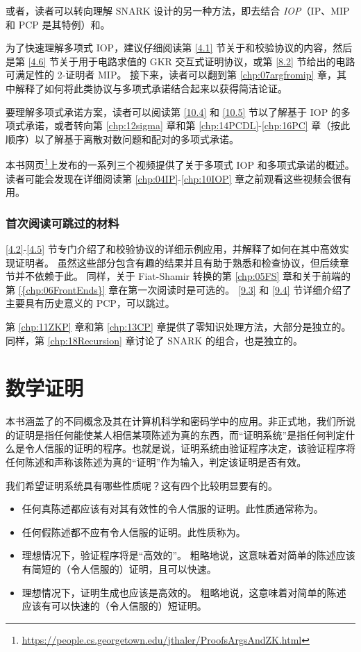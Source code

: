 或者，读者可以转向理解 SNARK 设计的另一种方法，即去结合 \emph{IOP}（IP、MIP 和 PCP 是其特例）和。

为了快速理解多项式 IOP，建议仔细阅读第 \ref{4.1} 节关于和校验协议的内容，然后是第 \ref{4.6} 节关于用于电路求值的 GKR 交互式证明协议，或第 \ref{8.2} 节给出的电路可满足性的 2-证明者 MIP。 
接下来，读者可以翻到第 \ref{chp:07argfromip} 章，其中解释了如何将此类协议与多项式承诺结合起来以获得简洁论证。

要理解多项式承诺方案，读者可以阅读第 \ref{10.4} 和 \ref{10.5} 节以了解基于 IOP 的多项式承诺，或者转向第 \ref{chp:12sigma} 章和第 \ref{chp:14PCDL}-\ref{chp:16PC} 章（按此顺序）以了解基于离散对数问题和配对的多项式承诺。

本书网页\footnote{\url{https://people.cs.georgetown.edu/jthaler/ProofsArgsAndZK.html}}上发布的一系列三个视频提供了关于多项式 IOP 和多项式承诺的概述。 读者可能会发现在详细阅读第 \ref{chp:04IP}-\ref{chp:10IOP} 章之前观看这些视频会很有用。


\subsubsection{首次阅读可跳过的材料} 
\ref{4.2}-\ref{4.5} 节专门介绍了和校验协议的详细示例应用，并解释了如何在其中高效实现证明者。 虽然这些部分包含有趣的结果并且有助于熟悉和检查协议，但后续章节并不依赖于此。 同样，关于 Fiat-Shamir 转换的第 \ref{chp:05FS} 章和关于前端的第 \ref{{chp:06FrontEnds}} 章在第一次阅读时是可选的。 \ref{9.3} 和 \ref{9.4} 节详细介绍了主要具有历史意义的 PCP，可以跳过。

第 \ref{chp:11ZKP} 章和第 \ref{chp:13CP} 章提供了零知识处理方法，大部分是独立的。 同样，第 \ref{chp:18Recursion} 章讨论了 SNARK 的组合，也是独立的。



\section{数学证明}
本书涵盖了的不同概念及其在计算机科学和密码学中的应用。非正式地，我们所说的证明是指任何能使某人相信某项陈述为真的东西，而“证明系统”是指任何判定什么是令人信服的证明的程序。也就是说，证明系统由验证程序决定，该验证程序将任何陈述和声称该陈述为真的“证明”作为输入，判定该证明是否有效。

我们希望证明系统具有哪些性质呢？这有四个比较明显要有的。
\begin{itemize}
    \item 任何真陈述都应该有对其有效性的令人信服的证明。此性质通常称为。
    \item 任何假陈述都不应有令人信服的证明。此性质称为。
    \item 理想情况下，验证程序将是“高效的”。 粗略地说，这意味着对简单的陈述应该有简短的（令人信服的）证明，且可以快速。
    \item 理想情况下，证明生成也应该是高效的。 粗略地说，这意味着对简单的陈述应该有可以快速的（令人信服的）短证明。
\end{itemize}


